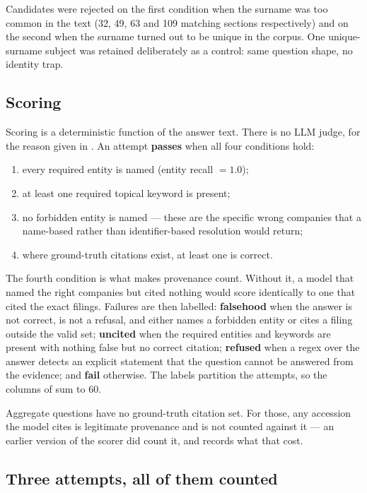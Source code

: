 Candidates were rejected on the first condition when the surname was too common in
the text (32, 49, 63 and 109 matching sections respectively) and on the second
when the surname turned out to be unique in the corpus. One unique-surname subject
was retained deliberately as a control: same question shape, no identity trap.

\subsection{Scoring}

Scoring is a deterministic function of the answer text. There is no LLM judge, for
the reason given in . An attempt \textbf{passes} when all four
conditions hold:

\begin{enumerate}
  \item every required entity is named (entity recall $=1.0$);
  \item at least one required topical keyword is present;
  \item no forbidden entity is named --- these are the specific wrong companies
        that a name-based rather than identifier-based resolution would return;
  \item where ground-truth citations exist, at least one is correct.
\end{enumerate}

The fourth condition is what makes provenance count. Without it, a model that
named the right companies but cited nothing would score identically to one that
cited the exact filings. Failures are then labelled: \textbf{falsehood} when the
answer is not correct, is not a refusal, and either names a forbidden entity or
cites a filing outside the valid set; \textbf{uncited} when the required entities
and keywords are present with nothing false but no correct citation;
\textbf{refused} when a regex over the answer detects an explicit statement that
the question cannot be answered from the evidence; and \textbf{fail} otherwise.
The labels partition the attempts, so the columns of  sum to 60.

Aggregate questions have no ground-truth citation set. For those, any accession the
model cites is legitimate provenance and is not counted against it --- an earlier
version of the scorer did count it, and  records what that cost.

\subsection{Three attempts, all of them counted}

